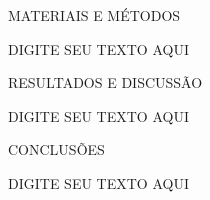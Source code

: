 \documentclass[a4paper,8pt]{article}
\begin{document}
\begin{slide}{MATERIAIS E MÉTODOS}
\begin{minipage}{\columnwidth}

DIGITE SEU TEXTO AQUI
\end{minipage}
\end{slide}


\begin{slide}{RESULTADOS E DISCUSSÃO}
\begin{minipage}{\columnwidth}

DIGITE SEU TEXTO AQUI
\end{minipage}
\end{slide}


\begin{slide}{CONCLUSÕES}
\begin{minipage}{\columnwidth}

DIGITE SEU TEXTO AQUI
\end{minipage}
\end{slide}
\end{document}

